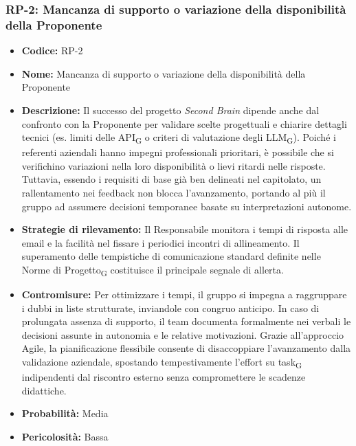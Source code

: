 ﻿\documentclass[a4paper, 10pt, colorlinks=true, linkcolor=black, urlcolor=blue, citecolor=blue, hidelinks]{article}
\begin{document}
\subsubsection{RP-2: Mancanza di supporto o variazione della disponibilità della Proponente}
\begin{itemize}
    \item \textbf{Codice:} RP-2
    \item \textbf{Nome:} Mancanza di supporto o variazione della disponibilità della Proponente

    \item \textbf{Descrizione:} Il successo del progetto \textit{Second Brain} dipende anche dal confronto con la Proponente per validare scelte progettuali e chiarire dettagli tecnici (es. limiti delle API\textsubscript{G} o criteri di valutazione degli LLM\textsubscript{G}). Poiché i referenti aziendali hanno impegni professionali prioritari, è possibile che si verifichino variazioni nella loro disponibilità o lievi ritardi nelle risposte. Tuttavia, essendo i requisiti di base già ben delineati nel capitolato, un rallentamento nei feedback non blocca l'avanzamento, portando al più il gruppo ad assumere decisioni temporanee basate su interpretazioni autonome.

    \item \textbf{Strategie di rilevamento:} Il Responsabile monitora i tempi di risposta alle email e la facilità nel fissare i periodici incontri di allineamento. Il superamento delle tempistiche di comunicazione standard definite nelle Norme di Progetto\textsubscript{G} costituisce il principale segnale di allerta.

    \item \textbf{Contromisure:} Per ottimizzare i tempi, il gruppo si impegna a raggruppare i dubbi in liste strutturate, inviandole con congruo anticipo. In caso di prolungata assenza di supporto, il team documenta formalmente nei verbali le decisioni assunte in autonomia e le relative motivazioni. Grazie all'approccio Agile, la pianificazione flessibile consente di disaccoppiare l'avanzamento dalla validazione aziendale, spostando tempestivamente l'effort su task\textsubscript{G} indipendenti dal riscontro esterno senza compromettere le scadenze didattiche.

    \item \textbf{Probabilità:} Media

    \item \textbf{Pericolosità:} Bassa
\end{itemize}
\end{document}
